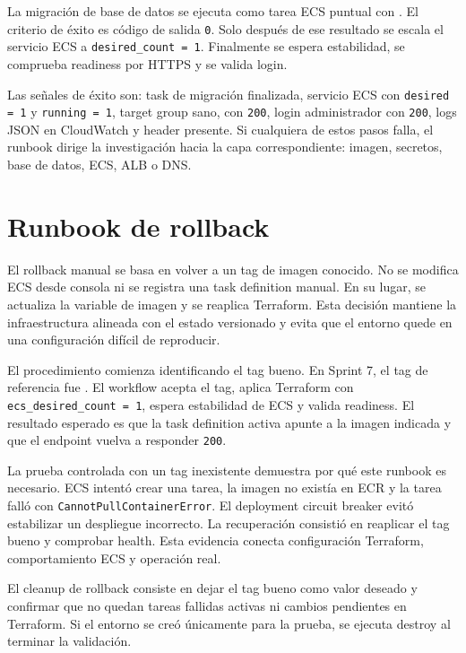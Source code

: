 La migración de base de datos se ejecuta como tarea ECS puntual con . El criterio de éxito es código de salida \texttt{0}. Solo después de ese resultado se escala el servicio ECS a \texttt{desired\_count = 1}. Finalmente se espera estabilidad, se comprueba readiness por HTTPS y se valida login.

Las señales de éxito son: task de migración finalizada, servicio ECS con \texttt{desired = 1} y \texttt{running = 1}, target group sano,  con \texttt{200}, login administrador con \texttt{200}, logs JSON en CloudWatch y header  presente. Si cualquiera de estos pasos falla, el runbook dirige la investigación hacia la capa correspondiente: imagen, secretos, base de datos, ECS, ALB o DNS.

\section{Runbook de rollback}
\label{sec:runbook-rollback}

El rollback manual se basa en volver a un tag de imagen conocido. No se modifica ECS desde consola ni se registra una task definition manual. En su lugar, se actualiza la variable de imagen y se reaplica Terraform. Esta decisión mantiene la infraestructura alineada con el estado versionado y evita que el entorno quede en una configuración difícil de reproducir.

El procedimiento comienza identificando el tag bueno. En Sprint 7, el tag de referencia fue . El workflow  acepta el tag, aplica Terraform con \texttt{ecs\_desired\_count = 1}, espera estabilidad de ECS y valida readiness. El resultado esperado es que la task definition activa apunte a la imagen indicada y que el endpoint vuelva a responder \texttt{200}.

La prueba controlada con un tag inexistente demuestra por qué este runbook es necesario. ECS intentó crear una tarea, la imagen no existía en ECR y la tarea falló con \texttt{CannotPullContainerError}. El deployment circuit breaker evitó estabilizar un despliegue incorrecto. La recuperación consistió en reaplicar el tag bueno y comprobar health. Esta evidencia conecta configuración Terraform, comportamiento ECS y operación real.

El cleanup de rollback consiste en dejar el tag bueno como valor deseado y confirmar que no quedan tareas fallidas activas ni cambios pendientes en Terraform. Si el entorno se creó únicamente para la prueba, se ejecuta destroy al terminar la validación.

